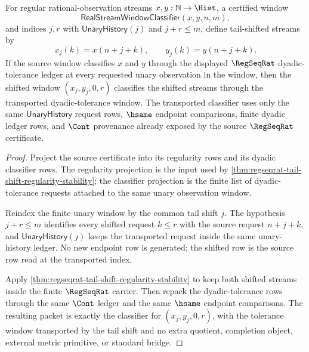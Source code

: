 \begin{theorem}
\label{thm:regseqrat-tail-shift-dyadic-tolerance-stability}
For regular rational-observation streams $x,y:\mathbb{N}\to\Hist$, a certified
window
$$
\mathsf{RealStreamWindowClassifier}(x,y,n,m),
$$
and indices $j,r$ with $\mathsf{UnaryHistory}(j)$ and $j+r\le m$, define
tail-shifted streams by
$$
x_j(k)=x(n+j+k),\qquad y_j(k)=y(n+j+k).
$$
If the source window classifies $x$ and $y$ through the displayed $\RegSeqRat$
dyadic-tolerance ledger at every requested unary observation in the window,
then the shifted window $(x_j,y_j,0,r)$ classifies the shifted streams through
the transported dyadic-tolerance window. The transported classifier uses only
the same $\mathsf{UnaryHistory}$ request rows, $\hsame$ endpoint comparisons,
finite dyadic ledger rows, and $\Cont$ provenance already exposed by the source
$\RegSeqRat$ certificate.
\end{theorem}
\begin{proof}
Project the source certificate into its regularity rows and its dyadic
classifier rows. The regularity projection is the input used by
\autoref{thm:regseqrat-tail-shift-regularity-stability}; the classifier
projection is the finite list of dyadic-tolerance requests attached to the same
unary observation window.

Reindex the finite unary window by the common tail shift $j$. The hypothesis
$j+r\le m$ identifies every shifted request $k\le r$ with the source request
$n+j+k$, and $\mathsf{UnaryHistory}(j)$ keeps the transported request inside the
same unary-history ledger. No new endpoint row is generated; the shifted row is
the source row read at the transported index.

Apply \autoref{thm:regseqrat-tail-shift-regularity-stability} to keep both
shifted streams inside the finite $\RegSeqRat$ carrier. Then repack the
dyadic-tolerance rows through the same $\Cont$ ledger and the same $\hsame$
endpoint comparisons. The resulting packet is exactly the classifier for
$(x_j,y_j,0,r)$, with the tolerance window transported by the tail shift and no
extra quotient, completion object, external metric primitive, or standard
bridge.
\end{proof}

